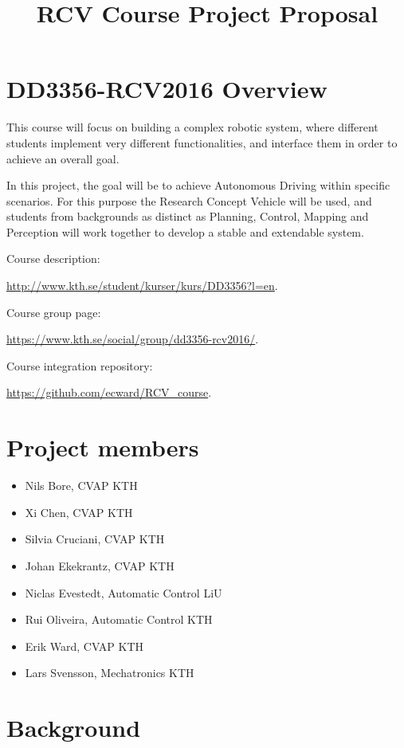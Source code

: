 \documentclass[11pt,a4paper]{article}
\title{RCV Course Project Proposal}
\begin{document}
\maketitle

\section{DD3356-RCV2016 Overview}

This course will focus on building a complex robotic system, where different students implement very different functionalities, and interface them in order to achieve an overall goal.

In this project, the goal will be to achieve Autonomous Driving within specific scenarios. For this purpose the Research Concept Vehicle will be used, and students from backgrounds as distinct as Planning, Control, Mapping and Perception will work together to develop a stable and extendable system.

Course description:

\url{http://www.kth.se/student/kurser/kurs/DD3356?l=en}.

Course group page:

\url{https://www.kth.se/social/group/dd3356-rcv2016/}.

Course integration repository:

\url{https://github.com/ecward/RCV_course}.

\section{Project members}

\begin{itemize}
\item Nils Bore, CVAP KTH
\item Xi Chen, CVAP KTH
\item Silvia Cruciani, CVAP KTH
\item Johan Ekekrantz, CVAP KTH
\item Niclas Evestedt, Automatic Control LiU
\item Rui Oliveira, Automatic Control KTH
\item Erik Ward, CVAP KTH
\item Lars Svensson, Mechatronics KTH
\end{itemize}

\section{Background}
\end{document}
